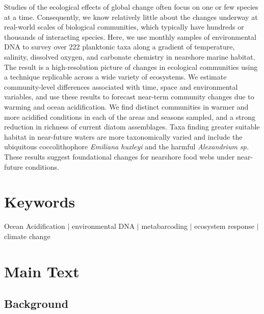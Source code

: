 \documentclass[11pt]{article}
\begin{document}
\begin{linenumbers}
Studies of the ecological effects of global change often focus on one or few species at a time. Consequently, we know relatively little about the changes underway at real-world scales of biological communities, which typically have hundreds or thousands of interacting species. Here, we use monthly samples of environmental DNA to survey over 222 planktonic taxa along a gradient of temperature, salinity, dissolved oxygen, and carbonate chemistry in nearshore marine habitat. The result is a high-resolution picture of changes in ecological communities using a technique replicable across a wide variety of ecosystems. We estimate community-level differences associated with time, space and environmental variables, and use these results to forecast near-term community changes due to warming and ocean acidification. We find distinct communities in warmer and more acidified conditions in each of the areas and seasons sampled, and a strong reduction in richness of current diatom assemblages. Taxa finding greater suitable habitat in near-future waters are more taxonomically varied and include the ubiquitous coccolithophore \textit{Emiliana huxleyi} and the harmful \textit{Alexandrium sp.} These results suggest foundational changes for nearshore food webs under near-future conditions.



\section{Keywords}
Ocean Acidification $|$ environmental DNA $|$ metabarcoding $|$ ecosystem response $|$ climate change

\section{Main Text}


\subsection{Background}




\end{linenumbers}
\end{document}
